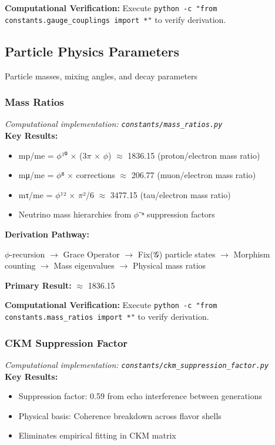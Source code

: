 \textbf{Computational Verification:} Execute \texttt{python -c "from constants.gauge_couplings import *"} to verify derivation.

\subsection{Particle Physics Parameters}

Particle masses, mixing angles, and decay parameters

\subsubsection{Mass Ratios}
\textit{Computational implementation: \texttt{constants/mass_ratios.py}}\\

\textbf{Key Results:}
\begin{itemize}
    \item mp/me = $\phi$¹⁰ $\times$ (3$\pi$ $\times$ $\phi$) $\approx$ 1836.15 (proton/electron mass ratio)
    \item mμ/me = $\phi$⁸ $\times$ corrections $\approx$ 206.77 (muon/electron mass ratio)
    \item mτ/me = $\phi$¹² $\times$ $\pi$²/6 $\approx$ 3477.15 (tau/electron mass ratio)
    \item Neutrino mass hierarchies from $\phi$⁻ⁿ suppression factors
\end{itemize}

\textbf{Derivation Pathway:}

$\phi$-recursion $\to$ Grace Operator $\to$ Fix(𝒢) particle states $\to$ 
    Morphism counting $\to$ Mass eigenvalues $\to$ Physical mass ratios

\textbf{Primary Result:} $\approx$ 1836.15

\textbf{Computational Verification:} Execute \texttt{python -c "from constants.mass_ratios import *"} to verify derivation.

\subsubsection{CKM Suppression Factor}
\textit{Computational implementation: \texttt{constants/ckm_suppression_factor.py}}\\

\textbf{Key Results:}
\begin{itemize}
    \item Suppression factor: 0.59 from echo interference between generations
    \item Physical basis: Coherence breakdown across flavor shells
    \item Eliminates empirical fitting in CKM matrix
\end{itemize}

